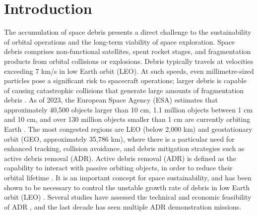 \documentclass[journal]{new-aiaa}
\begin{document}
%

\section{Introduction}
\label{sec-introduction}

The accumulation of space debris presents a direct challenge to the sustainability of orbital operations and the long-term viability of space exploration. Space debris comprises non-functional satellites, spent rocket stages, and fragmentation products from orbital collisions or explosions. Debris typically travels at velocities exceeding 7 km/s in low Earth orbit (LEO). At such speeds, even millimetre-sized particles pose a significant risk to spacecraft operations; larger debris is capable of causing catastrophic collisions that generate large amounts of fragmentation debris \cite{esaspacedebrisofficeESASANNUALSPACE2024}. As of 2023, the European Space Agency (ESA) estimates that approximately 40,500 objects larger than 10 cm, 1.1 million objects between 1 cm and 10 cm, and over 130 million objects smaller than 1 cm are currently orbiting Earth \cite{europeanspaceagencySpaceEnvironmentStatistics25}. The most congested regions are LEO (below 2,000 km) and geostationary orbit (GEO, approximately 35,786 km), where there is a particular need for enhanced tracking, collision avoidance, and debris mitigation strategies such as active debris removal (ADR). Active debris removal (ADR) is defined as the capability to interact with passive orbiting objects, in order to reduce their orbital lifetime  \cite{steeringgroupIADCStatementActive2022a}. It is an important concept for space sustainability, and has been shown to be necessary to control the unstable growth rate of debris in low Earth orbit (LEO) \cite{inter-agencyspacedebriscoordinationcommitteePeacefulUsesOuter1993,bastidavirgiliActiveDebrisRemoval2013}. Several studies have assessed the technical and economic feasibility of ADR \cite{ledkovReviewContactContactless2022,bonnalActiveDebrisRemoval2013}, and the last decade has seen multiple ADR demonstration missions.
\end{document}
